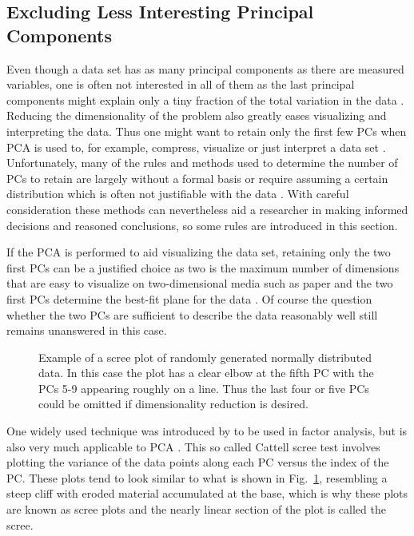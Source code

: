 \documentclass[english, twoside]{HYgradu}
\begin{document}
\subsection{Excluding Less Interesting Principal Components} \label{sect:pca-excluding}
Even though a data set has as many principal components as there are measured variables, one is often not interested in all of them as the last principal components might explain only a tiny fraction of the total variation in the data \citep{james2013introduction}. Reducing the dimensionality of the problem also greatly eases visualizing and interpreting the data. Thus one might want to retain only the first few PCs when PCA is used to, for example, compress, visualize or just interpret a data set \citep{james2013introduction, johnson2007applied}. Unfortunately, many of the rules and methods used to determine the number of PCs to retain are largely without a formal basis or require assuming a certain distribution which is often not justifiable with the data \citep{jolliffe2002principal}. With careful consideration these methods can nevertheless aid a researcher in making informed decisions and reasoned conclusions, so some rules are introduced in this section.

If the PCA is performed to aid visualizing the data set, retaining only the two first PCs can be a justified choice as two is the maximum number of dimensions that are easy to visualize on two-dimensional media such as paper and the two first PCs determine the best-fit plane for the data \citep{jolliffe2002principal}. Of course the question whether the two PCs are sufficient to describe the data reasonably well still remains unanswered in this case.

\begin{figure}
    \centering
    
    \caption{Example of a scree plot of randomly generated normally distributed data. In this case the plot has a clear elbow at the fifth PC with the PCs 5-9 appearing roughly on a line. Thus the last four or five PCs could be omitted if dimensionality reduction is desired.}\label{fig:scree}
\end{figure}

One widely used technique was introduced by \citet{cattell1966scree} to be used in factor analysis, but is also very much applicable to PCA \citep{jolliffe2002principal}. This so called Cattell scree test involves plotting the variance of the data points along each PC versus the index of the PC. These plots tend to look similar to what is shown in Fig.\ \ref{fig:scree}, resembling a steep cliff with eroded material accumulated at the base, which is why these plots are known as scree plots and the nearly linear section of the plot is called the scree.
\end{document}
